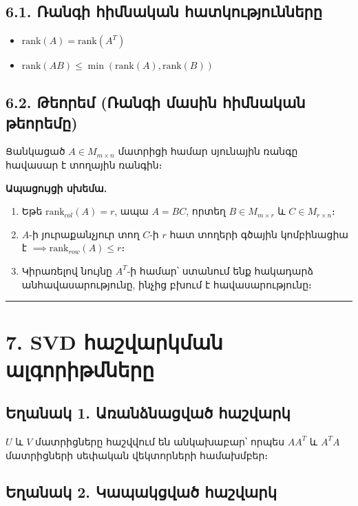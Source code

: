 \documentclass[12pt, a4paper]{article}
\begin{document}
\subsection{6.1. Ռանգի հիմնական հատկությունները}

\begin{itemize}
    \item $\text{rank}(A) = \text{rank}(A^T)$
    \item $\text{rank}(AB) \le \min(\text{rank}(A), \text{rank}(B))$
\end{itemize}

\subsection{6.2. Թեորեմ (Ռանգի մասին հիմնական թեորեմը)}

Ցանկացած $A \in M_{m \times n}$ մատրիցի համար սյունային ռանգը հավասար է տողային ռանգին։

\textbf{Ապացույցի սխեմա.}

\begin{enumerate}
    \item Եթե $\text{rank}_{col}(A) = r$, ապա $A = BC$, որտեղ $B \in M_{m \times r}$ և $C \in M_{r \times n}$։
    \item $A$-ի յուրաքանչյուր տող $C$-ի $r$ հատ տողերի գծային կոմբինացիա է $\implies \text{rank}_{row}(A) \le r$։
    \item Կիրառելով նույնը $A^T$-ի համար՝ ստանում ենք հակադարձ անհավասարությունը, ինչից բխում է հավասարությունը։
\end{enumerate}

\vspace{1em}
\hrule
\vspace{1em}

\section{7. SVD հաշվարկման ալգորիթմները}

\subsection{Եղանակ 1. Առանձնացված հաշվարկ}

$U$ և $V$ մատրիցները հաշվվում են անկախաբար՝ որպես $A A^T$ և $A^T A$ մատրիցների սեփական վեկտորների համախմբեր։

\subsection{Եղանակ 2. Կապակցված հաշվարկ}
\end{document}
